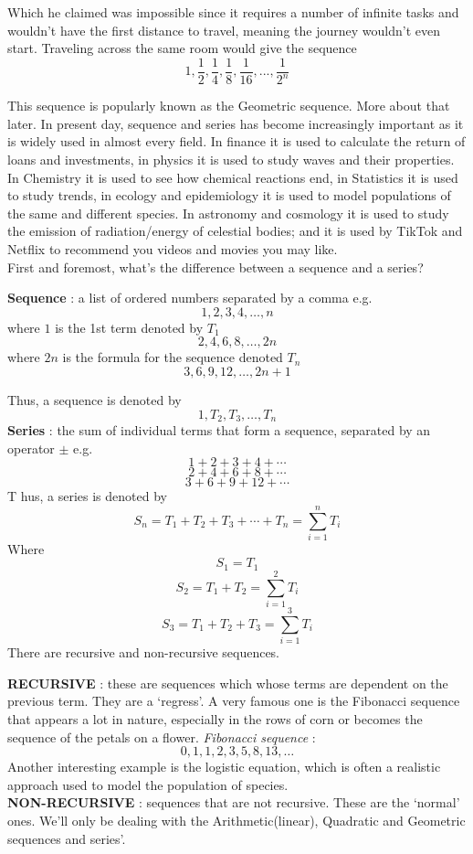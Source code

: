 \documentclass[
  letterpaper,
  DIV=11,
  numbers=noendperiod]{scrreprt}
\begin{document}
Which he claimed was impossible since it requires a number of infinite
tasks and wouldn't have the first distance to travel, meaning the
journey wouldn't even start. Traveling across the same room would give
the sequence \[
1,\frac{1}{2},\frac{1}{4},\frac{1}{8},\frac{1}{16},...,\frac{1}{2^n}
\]

This sequence is popularly known as the Geometric sequence. More about
that later. In present day, sequence and series has become increasingly
important as it is widely used in almost every field. In finance it is
used to calculate the return of loans and investments, in physics it is
used to study waves and their properties. In Chemistry it is used to see
how chemical reactions end, in Statistics it is used to study trends, in
ecology and epidemiology it is used to model populations of the same and
different species. In astronomy and cosmology it is used to study the
emission of radiation/energy of celestial bodies; and it is used by
TikTok and Netflix to recommend you videos and movies you may like.\\
First and foremost, what's the difference between a sequence and a
series?

\textbf{Sequence} : a list of ordered numbers separated by a comma
e.g.~\[1,2,3,4,…,𝑛\] where \(1\) is the 1st term denoted by \(T_1\)
\[2,4,6,8,…,2n\] where \(2n\) is the formula for the sequence denoted
\(𝑇_𝑛\) \[3,6,9,12,…,2𝑛+1\]

Thus, a sequence is denoted by \[
1, 𝑇_2, 𝑇_3,…,𝑇_𝑛 
\] \textbf{Series} : the sum of individual terms that form a sequence,
separated by an operator \(\pm\) e.g.~\[1 + 2 +3+4+⋯ \] \[2 +4+6+8+⋯ \]
\[3 +6+9+12+⋯ \] T hus, a series is denoted by \[
S_n = 𝑇_1 +𝑇_2+𝑇_3+⋯+𝑇_𝑛 = \sum_{i=1}^{n}T_i
\] Where \[
 S_1 = 𝑇_1 
\] \[
 𝑆_2 = 𝑇_1 +T_2 = \sum_{i=1}^{2} T_𝑖
\] \[
 𝑆_3 = 𝑇_1 +T_2 +T_3 = \sum_{i=1}^{3} T_𝑖
\] There are recursive and non-recursive sequences.

\textbf{RECURSIVE} : these are sequences which whose terms are dependent
on the previous term. They are a `regress'. A very famous one is the
Fibonacci sequence that appears a lot in nature, especially in the rows
of corn or becomes the sequence of the petals on a flower.
\emph{Fibonacci sequence} : \[0,1,1,2,3,5,8,13,… \] Another interesting
example is the logistic equation, which is often a realistic approach
used to model the population of species.\\
\textbf{NON-RECURSIVE} : sequences that are not recursive. These are the
`normal' ones. We'll only be dealing with the Arithmetic(linear),
Quadratic and Geometric sequences and series'.
\end{document}
